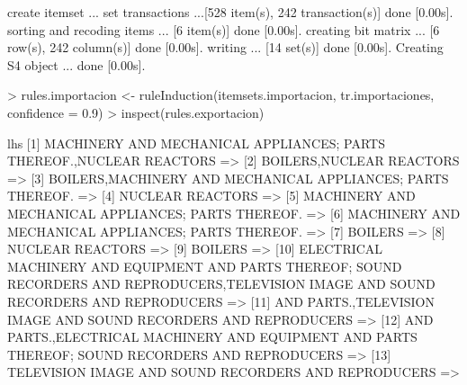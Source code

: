 \documentclass [a4paper] {article}
\begin{document}
{\begin{Schunk}
\begin{Soutput}
create itemset ... 
set transactions ...[528 item(s), 242 transaction(s)] done [0.00s].
sorting and recoding items ... [6 item(s)] done [0.00s].
creating bit matrix ... [6 row(s), 242 column(s)] done [0.00s].
writing  ... [14 set(s)] done [0.00s].
Creating S4 object  ... done [0.00s].
\end{Soutput}
\begin{Sinput}
> rules.importacion <- ruleInduction(itemsets.importacion, tr.importaciones, confidence = 0.9)
> inspect(rules.exportacion)
\end{Sinput}
\begin{Soutput}
     lhs                                                                                                                                            
[1]  {MACHINERY AND MECHANICAL APPLIANCES; PARTS THEREOF.,NUCLEAR REACTORS}                                                                       =>
[2]  {BOILERS,NUCLEAR REACTORS}                                                                                                                   =>
[3]  {BOILERS,MACHINERY AND MECHANICAL APPLIANCES; PARTS THEREOF.}                                                                                =>
[4]  {NUCLEAR REACTORS}                                                                                                                           =>
[5]  {MACHINERY AND MECHANICAL APPLIANCES; PARTS THEREOF.}                                                                                        =>
[6]  {MACHINERY AND MECHANICAL APPLIANCES; PARTS THEREOF.}                                                                                        =>
[7]  {BOILERS}                                                                                                                                    =>
[8]  {NUCLEAR REACTORS}                                                                                                                           =>
[9]  {BOILERS}                                                                                                                                    =>
[10] {ELECTRICAL MACHINERY AND EQUIPMENT AND PARTS THEREOF; SOUND RECORDERS AND REPRODUCERS,TELEVISION IMAGE AND SOUND RECORDERS AND REPRODUCERS} =>
[11] {AND PARTS.,TELEVISION IMAGE AND SOUND RECORDERS AND REPRODUCERS}                                                                            =>
[12] {AND PARTS.,ELECTRICAL MACHINERY AND EQUIPMENT AND PARTS THEREOF; SOUND RECORDERS AND REPRODUCERS}                                           =>
[13] {TELEVISION IMAGE AND SOUND RECORDERS AND REPRODUCERS}                                                                                       =>

\end{Soutput}
\end{Schunk}}
\end{document}
